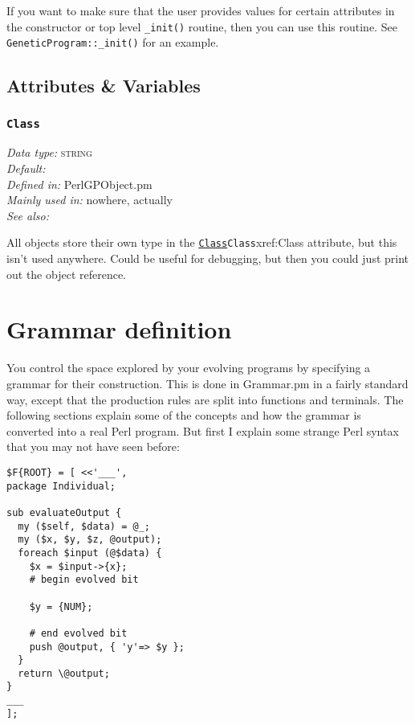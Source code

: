 \documentclass[a4paper]{article}
\begin{document}
If you want to make sure that the user provides values for certain
attributes in the constructor or top level \texttt{\_init()} routine,
then you can use this routine.  See \texttt{GeneticProgram::\_init()}
for an example.


\subsection{Attributes \& Variables}

\subsubsection{\texttt{Class}}\label{xref:Class}
\begin{flushleft}
\textit{Data type:} \textsc{string}\\
\textit{Default:} \\
\textit{Defined in:} PerlGPObject.pm\\
\textit{Mainly used in:} nowhere, actually\\
\textit{See also:}
\end{flushleft}

All objects store their own type in the \hyperref[no]{\texttt{Class}}{\texttt{Class}}{xref:Class} attribute, but
this isn't used anywhere.  Could be useful for debugging, but then
you could just print out the object reference.

\section{Grammar definition}\label{Grammar}

You control the space explored by your evolving programs by specifying
a grammar for their construction.  This is done in Grammar.pm in a
fairly standard way, except that the production rules are split into
functions and terminals.  The following sections explain some of the
concepts and how the grammar is converted into a real Perl
program. But first I explain some strange Perl syntax that you may not
have seen before:


\begin{verbatim}
$F{ROOT} = [ <<'___',
package Individual;

sub evaluateOutput {
  my ($self, $data) = @_;
  my ($x, $y, $z, @output);
  foreach $input (@$data) {
    $x = $input->{x};
    # begin evolved bit

    $y = {NUM};

    # end evolved bit
    push @output, { 'y'=> $y };
  }
  return \@output;
}
___
];
\end{verbatim}
\end{document}
